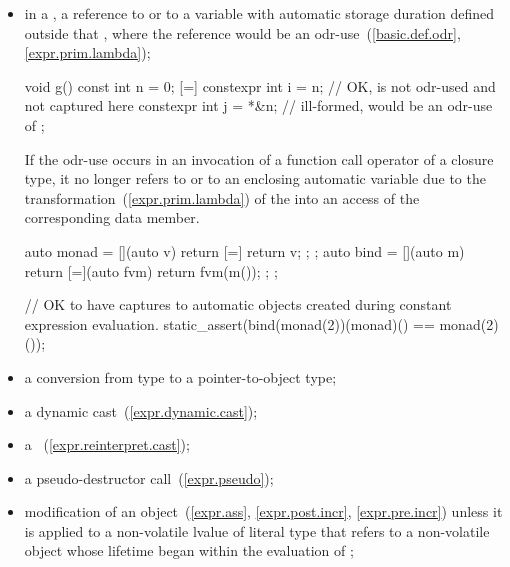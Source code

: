 \begin{itemize}
\item
in a ,
a reference to  or to a variable with
automatic storage duration defined outside that
, where
the reference would be an odr-use~(\ref{basic.def.odr}, \ref{expr.prim.lambda});
\begin{example}
\begin{codeblock}
void g() {
  const int n = 0;
  [=] {
    constexpr int i = n;   // OK,  is not odr-used and not captured here
    constexpr int j = *&n; // ill-formed,  would be an odr-use of 
  };
}
\end{codeblock}
\end{example}
\begin{note}
If the odr-use occurs in an invocation
of a function call operator of a closure type,
it no longer refers to  or to an enclosing automatic variable
due to the transformation~(\ref{expr.prim.lambda})
of the  into
an access of the corresponding data member.
\begin{example}
\begin{codeblock}
auto monad = [](auto v) { return [=] { return v; }; };
auto bind = [](auto m) {
  return [=](auto fvm) { return fvm(m()); };
};

// OK to have captures to automatic objects created during constant expression evaluation.
static_assert(bind(monad(2))(monad)() == monad(2)());
\end{codeblock}
\end{example}
\end{note}

\item
a conversion from type \cv{}  to a pointer-to-object type;

\item
a dynamic cast~(\ref{expr.dynamic.cast});

\item
a ~(\ref{expr.reinterpret.cast});

\item
a pseudo-destructor call~(\ref{expr.pseudo});

\item
modification of an object~(\ref{expr.ass}, \ref{expr.post.incr},
\ref{expr.pre.incr})
unless it is applied to a non-volatile lvalue of literal type
that refers to a non-volatile object
whose lifetime began within the evaluation of ;


\end{itemize}

